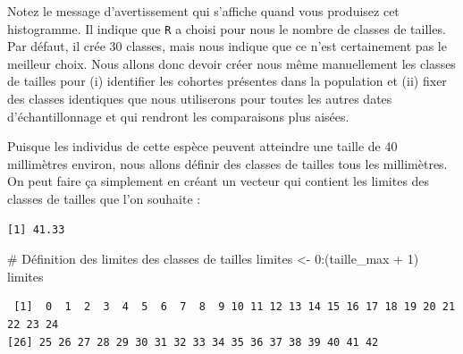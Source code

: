 \documentclass[
  french,
  a4paper,
  DIV=11,
  numbers=noendperiod,
  oneside]{scrreprt}
\newenvironment{Shaded}{}{}
\newcommand{\AttributeTok}[1]{\textcolor[rgb]{0.84,0.23,0.29}{#1}}
\newcommand{\CommentTok}[1]{\textcolor[rgb]{0.42,0.45,0.49}{#1}}
\newcommand{\ConstantTok}[1]{\textcolor[rgb]{0.00,0.36,0.77}{#1}}
\newcommand{\DecValTok}[1]{\textcolor[rgb]{0.00,0.36,0.77}{#1}}
\newcommand{\FunctionTok}[1]{\textcolor[rgb]{0.44,0.26,0.76}{#1}}
\newcommand{\NormalTok}[1]{\textcolor[rgb]{0.14,0.16,0.18}{#1}}
\newcommand{\OtherTok}[1]{\textcolor[rgb]{0.44,0.26,0.76}{#1}}
\newcommand{\SpecialCharTok}[1]{\textcolor[rgb]{0.00,0.36,0.77}{#1}}
\begin{document}
\begin{tcolorbox}
{\begin{footnotesize}
\end{footnotesize}}

Notez le message d'avertissement qui s'affiche quand vous produisez cet
histogramme. Il indique que \texttt{R} a choisi pour nous le nombre de
classes de tailles. Par défaut, il crée 30 classes, mais nous indique
que ce n'est certainement pas le meilleur choix. Nous allons donc devoir
créer nous même manuellement les classes de tailles pour (i) identifier
les cohortes présentes dans la population et (ii) fixer des classes
identiques que nous utiliserons pour toutes les autres dates
d'échantillonnage et qui rendront les comparaisons plus aisées.

Puisque les individus de cette espèce peuvent atteindre une taille de 40
millimètres environ, nous allons définir des classes de tailles tous les
millimètres. On peut faire ça simplement en créant un vecteur qui
contient les limites des classes de tailles que l'on souhaite :

\begin{Shaded}
\end{Shaded}

\begin{verbatim}
[1] 41.33
\end{verbatim}


\begin{Shaded}
\begin{Highlighting}[]
\CommentTok{\# Définition des limites des classes de tailles}
\NormalTok{limites }\OtherTok{\textless{}{-}} \DecValTok{0}\SpecialCharTok{:}\NormalTok{(taille\_max }\SpecialCharTok{+} \DecValTok{1}\NormalTok{)}
\NormalTok{limites}
\end{Highlighting}
\end{Shaded}

\begin{verbatim}
 [1]  0  1  2  3  4  5  6  7  8  9 10 11 12 13 14 15 16 17 18 19 20 21 22 23 24
[26] 25 26 27 28 29 30 31 32 33 34 35 36 37 38 39 40 41 42
\end{verbatim}


\end{tcolorbox}
\end{document}
